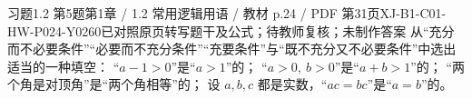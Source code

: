 \par\noindent\begin{minipage}{\linewidth}
\begin{bankitem}{习题1.2 第5题}{第1章 / 1.2 常用逻辑用语 / 教材 p.24 / PDF 第31页}{XJ-B1-C01-HW-P024-Y0260}{已对照原页转写题干及公式；待教师复核；未制作答案}
从“充分而不必要条件”“必要而不充分条件”“充要条件”与“既不充分又不必要条件”中选出适当的一种填空：
“$a-1>0$”是“$a>1$”的\blank；
“$a>0,\ b>0$”是“$a+b>1$”的\blank；
“两个角是对顶角”是“两个角相等”的\blank；
设 $a,b,c$ 都是实数，“$ac=bc$”是“$a=b$”的\blank。
\end{bankitem}
\end{minipage}\par\medskip
